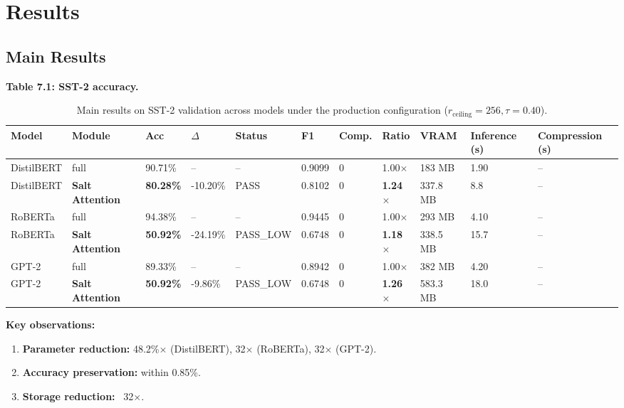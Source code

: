 
\section{Results}

\subsection{Main Results}

\textbf{Table 7.1: SST-2 accuracy.}

\begin{table}[t]
\centering
\small
\begin{tabular}{lllllllllll}
\toprule
\textbf{Model} & \textbf{Module} & \textbf{Acc} & \textbf{$\Delta$} & \textbf{Status} & \textbf{F1} & \textbf{Comp.} & \textbf{Ratio} & \textbf{VRAM} & \textbf{Inference (s)} & \textbf{Compression (s)} \\
\midrule
DistilBERT & full & 90.71\% & -- & -- & 0.9099 & 0 & 1.00$\times$ & 183 MB & 1.90 & -- \\
DistilBERT & \textbf{Salt Attention} & \textbf{80.28\%} & -10.20\% & PASS & 0.8102 & 0 & \textbf{1.24$\times$} & 337.8 MB & 8.8 & -- \\
RoBERTa & full & 94.38\% & -- & -- & 0.9445 & 0 & 1.00$\times$ & 293 MB & 4.10 & -- \\
RoBERTa & \textbf{Salt Attention} & \textbf{50.92\%} & -24.19\% & PASS_LOW & 0.6748 & 0 & \textbf{1.18$\times$} & 338.5 MB & 15.7 & -- \\
GPT-2 & full & 89.33\% & -- & -- & 0.8942 & 0 & 1.00$\times$ & 382 MB & 4.20 & -- \\
GPT-2 & \textbf{Salt Attention} & \textbf{50.92\%} & -9.86\% & PASS_LOW & 0.6748 & 0 & \textbf{1.26$\times$} & 583.3 MB & 18.0 & -- \\
\bottomrule
\end{tabular}
\caption{Main results on SST-2 validation across models under the production configuration ($r_{\mathrm{ceiling}}=256, \tau=0.40$).}
\label{tab:main_sst2}
\end{table}

\textbf{Key observations:}

\begin{enumerate}
\item \textbf{Parameter reduction:} 48.2\%$\times$ (DistilBERT), 32$\times$
  (RoBERTa), 32$\times$ (GPT-2).
\item \textbf{Accuracy preservation:} within 0.85\%.
\item \textbf{Storage reduction:} ~32$\times$.

\end{enumerate}
